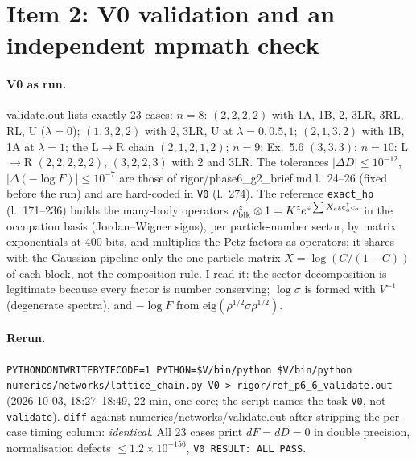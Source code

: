 \documentclass[11pt]{article}
\begin{document}
\section{Item 2: V0 validation and an independent mpmath check}\label{sec:i2}
\paragraph{V0 as run.} validate.out lists exactly 23 cases: $n=8$: $(2,2,2,2)$ with 1A, 1B, 2, 3LR, 3RL, RL, U
($\lambda=0$); $(1,3,2,2)$ with 2, 3LR, U at $\lambda=0,0.5,1$; $(2,1,3,2)$ with 1B, 1A at $\lambda=1$; the L$\to$R
chain $(2,1,2,1,2)$; $n=9$: Ex.~5.6 $(3,3,3)$; $n=10$: L$\to$R $(2,2,2,2,2)$, $(3,2,2,3)$ with 2 and 3LR.
The tolerances $|\Delta D|\le10^{-12}$, $|\Delta(-\log F)|\le10^{-7}$ are those of rigor/phase6\_g2\_brief.md
l.~24--26 (fixed before the run) and are hard-coded in \texttt{V0} (l.~274). The reference \texttt{exact\_hp}
(l.~171--236) builds the many-body operators $\rho_{\rm blk}^{z}\otimes1=K^ze^{z\sum X_{ab}c_a^\dagger c_b}$ in
the occupation basis (Jordan--Wigner signs), per particle-number sector, by matrix exponentials at 400 bits, and
multiplies the Petz factors as operators; it shares with the Gaussian pipeline only the one-particle matrix
$X=\log(C/(1-C))$ of each block, not the composition rule. I read it: the sector decomposition is legitimate
because every factor is number conserving; $\log\sigma$ is formed with $V^{-1}$ (degenerate spectra), and
$-\log F$ from $\mathrm{eig}(\rho^{1/2}\sigma\rho^{1/2})$.

\paragraph{Rerun.} \texttt{PYTHONDONTWRITEBYTECODE=1 PYTHON=\$V/bin/python \$V/bin/python
numerics/networks/lattice\_chain.py V0 > rigor/ref\_p6\_6\_validate.out} (2026-10-03, 18:27--18:49, 22 min,
one core; the script names the task \texttt{V0}, not \texttt{validate}). \texttt{diff} against
numerics/networks/validate.out after stripping the per-case timing column: \emph{identical}. All 23 cases print
$dF=dD=0$ in double precision, normalisation defects $\le1.2\times10^{-156}$, \texttt{V0 RESULT: ALL PASS}.
\end{document}
